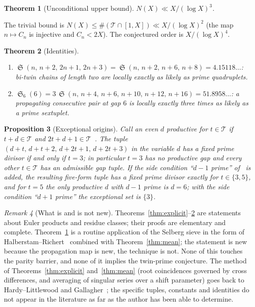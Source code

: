 \documentclass[11pt,a4paper]{article}
\theoremstyle{plain}
\newtheorem{theorem}{Theorem}[section]
\newtheorem{proposition}[theorem]{Proposition}
\theoremstyle{definition}
\theoremstyle{remark}
\newtheorem{remark}[theorem]{Remark}
\newcommand{\Tset}{\mathcal{T}}
\DeclareMathOperator{\Sing}{\mathfrak S}
\begin{document}
\begin{theorem}[Unconditional upper bound]\label{thm:upper}
$N(X)\ll X/(\log X)^3$.
\end{theorem}
\noindent
The trivial bound is $N(X)\le\#(\Tset\cap[1,X])\ll X/(\log X)^2$ (the
map $n\mapsto C_n$ is injective and $C_n<2X$).  The conjectured order is
$X/(\log X)^4$.

\begin{theorem}[Identities]\label{thm:identities}
\begin{enumerate}
\item[(a)] $\Sing(n,\,n+2,\,2n+1,\,2n+3)=\Sing(n,\,n+2,\,n+6,\,n+8)=4.15118\ldots$:
bi-twin chains of length two are locally exactly as likely as prime
quadruplets.
\item[(b)] $\Sing_6(6)=3\,\Sing(n,\,n+4,\,n+6,\,n+10,\,n+12,\,n+16)=51.8958\ldots$:
a propagating consecutive pair at gap $6$ is locally exactly three times as
likely as a prime sextuplet.
\end{enumerate}
\end{theorem}

\begin{proposition}[Exceptional origins]\label{prop:exceptional}
Call an even $d$ \emph{productive} for $t\in\Tset$ if $t+d\in\Tset$ and
$2t+d+1\in\Tset$~\cite{BiertonGap}.  The tuple
$(d+t,\,d+t+2,\,d+2t+1,\,d+2t+3)$ in the variable $d$ has a fixed prime
divisor if and only if $t=3$; in particular $t=3$ has no productive gap and
every other $t\in\Tset$ has an admissible gap tuple.  If the side condition
``$d-1$ prime'' of~\cite{BiertonGap} is added, the resulting five-form
tuple has a fixed prime divisor exactly for $t\in\{3,5\}$, and for $t=5$ the
only productive $d$ with $d-1$ prime is $d=6$; with the side condition
``$d+1$ prime'' the exceptional set is $\{3\}$.
\end{proposition}

\begin{remark}[What is and is not new]
Theorems~\ref{thm:explicit}--\ref{thm:identities} are statements about
Euler products and residue classes; their proofs are elementary and
complete.  Theorem~\ref{thm:upper} is a routine application of the Selberg
sieve in the form of Halberstam--Richert~\cite[Thm.~5.7]{HR} combined with
Theorem~\ref{thm:mean}; the statement is new because the propagation map
is new, the technique is not.  None of this touches the parity barrier, and
none of it implies the twin-prime conjecture.  The method of
Theorems~\ref{thm:explicit} and~\ref{thm:mean} (root coincidences governed
by cross differences, and averaging of singular series over a shift
parameter) goes back to Hardy--Littlewood and Gallagher~\cite{Gallagher};
the specific tuples, constants and identities do not appear in the
literature as far as the author has been able to determine.
\end{remark}
\end{document}
